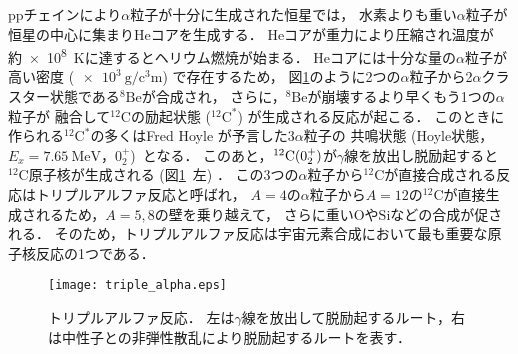 \documentclass[../master]{subfiles}
\begin{document}
ppチェインにより$\alpha$粒子が十分に生成された恒星では，
水素よりも重い$\alpha$粒子が恒星の中心に集まり$\mathrm{He}$コアを生成する．
$\mathrm{He}$コアが重力により圧縮され温度が約\SI{e8}{\kelvin}に達するとヘリウム燃焼が始まる．
$\mathrm{He}$コアには十分な量の$\alpha$粒子が高い密度 ($\SI{e3}{\gram\per\cubic\centi\metre}$) で存在するため，
図\ref{fig::triple_alpha}のように2つの$\alpha$粒子から2$\alpha$クラスター状態である${}^{8}\mathrm{Be}$が合成され，
さらに，${}^{8}\mathrm{Be}$が崩壊するより早くもう1つの$\alpha$粒子が
融合して${}^{12}\mathrm{C}$の励起状態 (${}^{12}\mathrm{C}^{*}$) が生成される反応が起こる．
このときに作られる${}^{12}\mathrm{C}^{*}$の多くはFred Hoyle が予言した$3\alpha$粒子の
共鳴状態 (Hoyle状態，$E_{x} = \SI{7.65}{\mega\electronvolt}$，$0_{2}^{+}$)~\cite{hoyle_state}となる．
このあと，${}^{12}{\rm C} (0_2^+)$が$\gamma$線を放出し脱励起すると${}^{12}\mathrm{C}$原子核が生成される
 (図\ref{fig::triple_alpha}~左) ．
この3つの$\alpha$粒子から${}^{12}\mathrm{C}$が直接合成される反応はトリプルアルファ反応と呼ばれ，
$A = 4$の$\alpha$粒子から$A = 12$の${}^{12}\mathrm{C}$が直接生成されるため，$A = 5, 8$の壁を乗り越えて，
さらに重い$\mathrm{O}$や$\mathrm{Si}$などの合成が促される．
そのため，トリプルアルファ反応は宇宙元素合成において最も重要な原子核反応の1つである．
\begin{figure}
  \centering
  \texttt{[image: triple\_alpha.eps]}
  \caption[トリプルアルファ反応．]{トリプルアルファ反応．
    左は$\gamma$線を放出して脱励起するルート，右は中性子との非弾性散乱により脱励起するルートを表す．}
  \label{fig::triple_alpha}
\end{figure}
\end{document}
